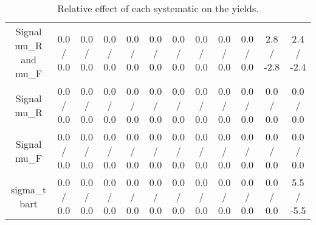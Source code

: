 \begin{table}[htbp]
\begin{center}
\begin{tabular}{|c|c|c|c|c|c|c|c|c|c|c|c|}
  Signal  mu_{R} and  mu_{F} & 0.0 / 0.0 & 0.0 / 0.0 & 0.0 / 0.0 & 0.0 / 0.0 & 0.0 / 0.0 & 0.0 / 0.0 & 0.0 / 0.0 & 0.0 / 0.0 & 0.0 / 0.0 & 2.8 / -2.8 & 2.4 / -2.4 \\ 
  Signal  mu_{R} & 0.0 / 0.0 & 0.0 / 0.0 & 0.0 / 0.0 & 0.0 / 0.0 & 0.0 / 0.0 & 0.0 / 0.0 & 0.0 / 0.0 & 0.0 / 0.0 & 0.0 / 0.0 & 0.0 / 0.0 & 0.0 / 0.0 \\ 
  Signal  mu_{F} & 0.0 / 0.0 & 0.0 / 0.0 & 0.0 / 0.0 & 0.0 / 0.0 & 0.0 / 0.0 & 0.0 / 0.0 & 0.0 / 0.0 & 0.0 / 0.0 & 0.0 / 0.0 & 0.0 / 0.0 & 0.0 / 0.0 \\ 
   sigma_{t bar{t}} & 0.0 / 0.0 & 0.0 / 0.0 & 0.0 / 0.0 & 0.0 / 0.0 & 0.0 / 0.0 & 0.0 / 0.0 & 0.0 / 0.0 & 0.0 / 0.0 & 0.0 / 0.0 & 0.0 / 0.0 & 5.5 / -5.5 \\ 
\hline 
\end{tabular} 
\caption{Relative effect of each systematic on the yields.} 
\end{center} 
\end{table} 
